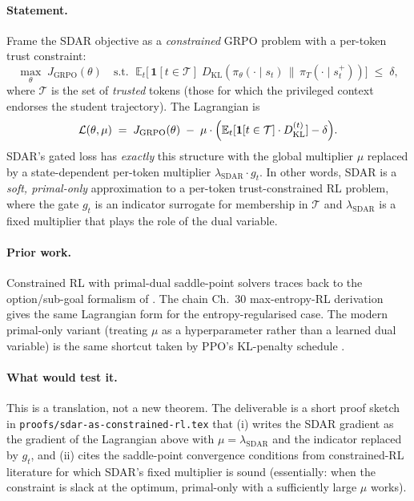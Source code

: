 \documentclass[11pt]{article}
\begin{document}
\paragraph{Statement.}  Frame the SDAR objective as a
\emph{constrained} GRPO problem with a per-token trust constraint:
\[
   \max_\theta \; J_{\mathrm{GRPO}}(\theta)
   \quad \text{s.t.\ } \;
   \mathbb{E}_t \bigl[\,\mathbf{1}[t\in\mathcal{T}]\;
        D_{\mathrm{KL}}(\pi_\theta(\cdot\mid s_t)\,\|\,\pi_T(\cdot\mid s_t^+))
   \bigr] \;\le\; \delta,
\]
where $\mathcal{T}$ is the set of \emph{trusted} tokens (those for which
the privileged context endorses the student trajectory).  The Lagrangian is
\[
   \mathcal{L}(\theta,\mu)
   \;=\; J_{\mathrm{GRPO}}(\theta) \;-\; \mu\cdot
        \Bigl(\mathbb{E}_t[\mathbf{1}[t\in\mathcal{T}]\cdot
              D_{\mathrm{KL}}^{(t)}] - \delta\Bigr).
\]
SDAR's gated loss has \emph{exactly} this structure with the global
multiplier $\mu$ replaced by a state-dependent per-token multiplier
$\lambda_{\mathrm{SDAR}}\cdot g_t$.  In other words, SDAR is a
\emph{soft, primal-only} approximation to a per-token trust-constrained RL
problem, where the gate $g_t$ is an indicator surrogate for membership in
$\mathcal{T}$ and $\lambda_{\mathrm{SDAR}}$ is a fixed multiplier that
plays the role of the dual variable.

\paragraph{Prior work.}  Constrained RL with primal-dual saddle-point
solvers traces back to the option/sub-goal formalism of
\citet{sutton1999options}.  The chain Ch.~30 max-entropy-RL derivation
gives the same Lagrangian form for the entropy-regularised case.  The
modern primal-only variant (treating $\mu$ as a hyperparameter rather than
a learned dual variable) is the same shortcut taken by PPO's KL-penalty
schedule \citep{schulman2017ppo}.

\paragraph{What would test it.}  This is a translation, not a new theorem.
The deliverable is a short proof sketch in
\texttt{proofs/sdar-as-constrained-rl.tex} that (i) writes the SDAR
gradient as the gradient of the Lagrangian above with $\mu = \lambda_{\mathrm{SDAR}}$
and the indicator replaced by $g_t$, and (ii) cites the saddle-point
convergence conditions from constrained-RL literature for which SDAR's
fixed multiplier is sound (essentially: when the constraint is slack at
the optimum, primal-only with a sufficiently large $\mu$ works).
\end{document}
